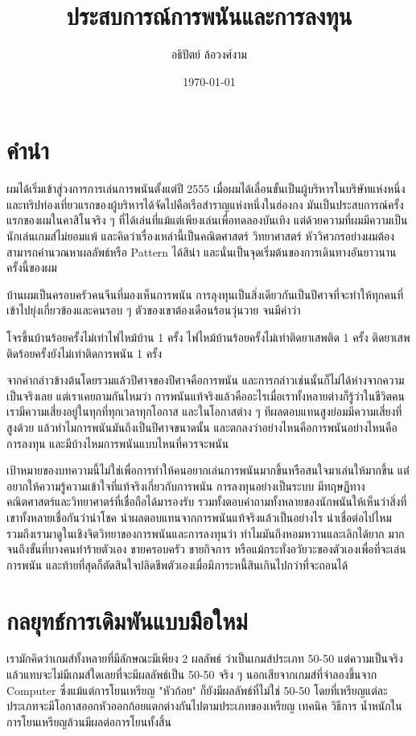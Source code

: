\documentclass{article}
\author{อธิปัตย์ ล้อวงศ์งาม}
\title{ประสบการณ์การพนันและการลงทุน}
\date{\today}
\begin{document}
\pagecolor{lightyellow}
\maketitle
\newpage
\tableofcontents

\newpage
\section{คำนำ}
ผมได้เริ่มเข้าสู่วงการการเล่นการพนันตั้งแต่ปี 2555 เมื่อผมได้เลื่อนขั้นเป็นผู้บริหารในบริษัทแห่งหนึ่งและทริปท่องเที่ยวแรกของผู้บริหารได้จัดไปคือเรือสำราญแห่งหนึ่งในฮ่องกง มันเป็นประสบการณ์ครั้งแรกของผมในคาสิโนจริง ๆ ที่ได้เล่นที่แม้แต่เพียงเล่นเพื่อทดลองบันเทิง แต่ด้วยความที่ผมมีความเป็นนักเล่นเกมส์ไม่ยอมแพ้ และคิดว่าเรื่องเหล่านี้เป็นคณิตศาสตร์ วิทยาศาสตร์ หัววิศวกรอย่างผมต้องสามารถคำนวณหาผลลัพธ์หรือ Pattern ได้สิน่า และนั่นเป็นจุดเริ่มต้นของการเดินทางอันยาวนานครั้งนี้ของผม

บ้านผมเป็นครอบครัวคนจีนที่มองเห็นการพนัน การลุงทุนเป็นสิ่งเดียวกันเป็นปีศาจที่จะทำให้ทุกคนที่เข้าไปยุ่งเกี่ยวข้องและคนรอบ ๆ ตัวของเขาต้องเดือนร้อนวุ่นวาย จนมีคำว่า

\begin{displayquote}
โจรขึ้นบ้านร้อยครั้งไม่เท่าไฟไหม้บ้าน 1 ครั้ง ไฟไหม้บ้านร้อยครั้งไม่เท่าติดยาเสพติด 1 ครั้ง ติดยาเสพติดร้อยครั้งยังไม่เท่าติดการพนัน 1 ครั้ง
\end{displayquote}

จากคำกล่าวข้างต้นโดยรวมแล้วปีศาจของปีศาจคือการพนัน และการกล่าวเช่นนั้นก็ไม่ได้ห่างจากความเป็นจริงเลย แต่เราเคยถามกันไหมว่า การพนันแท้จริงแล้วคืออะไรเมื่อเราทั้งหลายต่างก็รู้ว่าในชีวิตคนเรามีความเสี่ยงอยู่ในทุกที่ทุกเวลาทุกโอกาส และในโอกาสต่าง ๆ ทีผลตอบแทนสูงย่อมมีความเสี่ยงที่สูงด้วย แล้วทำไมการพนันมันถึงเป็นปีศาจขนาดนั้น และตกลงว่าอย่างไหนคือการพนันอย่างไหนคือการลงทุน และมีบ้างไหมการพนันแบบไหนที่ควรจะพนัน

เป้าหมายของบทความนี้ไม่ใช่เพื่อการทำให้คนอยากเล่นการพนันมากขึ้นหรือสนใจมาเล่นให้มากขึ้น แต่่อยากให้ความรู้ความเข้าใจที่แท้จริงเกี่ยวกับการพนัน การลงทุนอย่างเป็นระบบ มีทฤษฏีทางคณิตศาสตร์และวิทยาศาตร์ที่เชื่อถือได้มารองรับ รวมทั้งตอบคำถามทั้งหลายของนักพนันให้เห็นว่าสิ่งที่เขาทั้งหลายเชื่อกันว่านำโชค นำผลตอบแทนจากการพนันแท้จริงแล้วเป็นอย่างไร น่าเชื่อต่อไปไหม รวมถึงเรามาดูในเชิงจิตวิทยาของการพนันและการลงทุนว่า ทำไมมันถึงหอมหวานและเลิกได้ยาก มากจนถึงขั้นที่บางคนทำร้ายตัวเอง ขายครอบครัว ขายกิจการ หรือแม้กระทั่งอวัยวะของตัวเองเพื่อที่จะเล่นการพนัน และท้ายที่สุดก็ตัดสินใจปลิดชีพตัวเองเมื่อมีภาระหนี้สินเกินไปกว่าที่จะถอนได้

\newpage
\section{กลยุทธ์การเดิมพันแบบมือใหม่}
เรามักคิดว่าเกมส์ทั้งหลายที่มีลักษณะมีเพียง 2 ผลลัพธ์ ว่าเป็นเกมส์ประเภท 50-50 แต่ความเป็นจริงแล้วแทบจะไม่มีเกมส์ใดเลยที่จะมีผลลัพธ์เป็น 50-50 จริง ๆ นอกเสียจากเกมส์ที่จำลองขึ้นจาก Computer ซึ่งแม้แต่การโยนเหรียญ "หัวก้อย" ก็ยังมีผลลัพธ์ที่ไม่ใช่ 50-50 โดยที่เหรียญแต่ละประเภทจะมีโอกาสออกหัวออกก้อยแตกต่างกันไปตามประเภทของเหรียญ เทคนิค วิธีการ น้ำหนักในการโยนเหรียญล้วนมีผลต่อการโยนทั้งสิ้น
\end{document}
